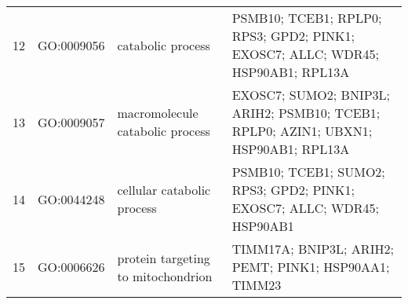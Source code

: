 \documentclass[10pt,letterpaper]{article}
\begin{document}
\begin{table}[!hp]
\begin{adjustwidth}{-.5in}{0in}
\begin{tabular}{|c|c|p{1.5in}|p{4in}|}
12 & GO:0009056 & catabolic process & \footnotesize{PSMB10; TCEB1; RPLP0; RPS3; GPD2; PINK1; EXOSC7; ALLC; WDR45; HSP90AB1; RPL13A} \\
13 & GO:0009057 & macromolecule catabolic process & \footnotesize{EXOSC7; SUMO2; BNIP3L; ARIH2; PSMB10; TCEB1; RPLP0; AZIN1; UBXN1; HSP90AB1; RPL13A} \\
14 & GO:0044248 & cellular catabolic process & \footnotesize{PSMB10; TCEB1; SUMO2; RPS3; GPD2; PINK1; EXOSC7; ALLC; WDR45; HSP90AB1} \\
 15 & GO:0006626 & protein targeting to mitochondrion  & \footnotesize{TIMM17A; BNIP3L; ARIH2; PEMT; PINK1; HSP90AA1; TIMM23} \\

\end{tabular}
\end{adjustwidth}
\end{table}
\end{document}
